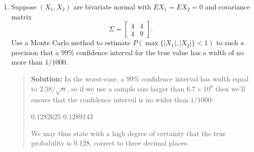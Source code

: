 \documentclass{article}
\begin{document}
\begin{enumerate}
  \item Suppose $(X_1, X_2)$ are bivariate normal with $E X_1=E X_2=0$ and
  covariance matrix 
  \[
  \Sigma = \begin{bmatrix}
  4 & 4 \\ 4 & 9
  \end{bmatrix}.
  \]
  Use a Monte Carlo method to estimate $P(\max\{ |X_1|, |X_2|\} <1)$ to such a
  precision that a 99\%
  confidence interval for the true value has a width of no more than $1/1000$.
    \begin{quotation}{\bf Solution:}
    In the worst-case, a 99\% confidence interval has width equal to 
    $2.58/\sqrt{n}$, so if we use a sample size larger than $6.7\times 10^6$
    then we'll ensure that the confidence interval is no wider than $1/1000$:
\begin{Schunk}
\begin{Soutput}
[1] 0.1282625 0.1289143
\end{Soutput}
\end{Schunk}
    We may thus state with a high degree of certainty that the true
    probability is 0.128, correct to three decimal places.
    \end{quotation}
  
\end{enumerate}
\end{document}

